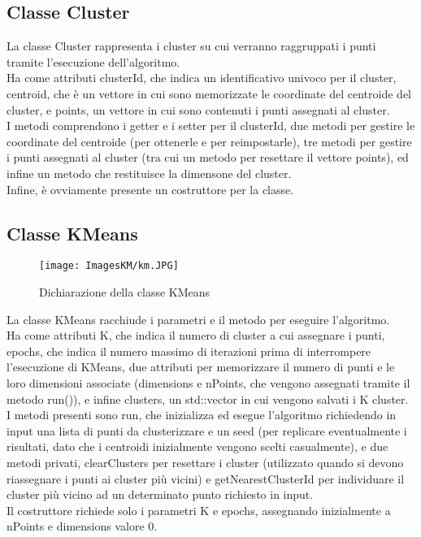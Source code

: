 \documentclass[10pt,twocolumn,letterpaper]{article}
\begin{document}
\subsection{Classe Cluster}
La classe Cluster rappresenta i cluster su cui verranno raggruppati i punti tramite l'esecuzione dell'algoritmo.\\
Ha come attributi clusterId, che  indica un identificativo univoco per il cluster, centroid, che è un vettore in cui sono memorizzate le coordinate del centroide del cluster, e points, un vettore in cui sono contenuti i punti assegnati al cluster.\\
I metodi comprendono i getter e i setter per il clusterId, due metodi per gestire le coordinate del centroide (per ottenerle e per reimpostarle), tre metodi per gestire i punti assegnati al cluster (tra cui un metodo per resettare il vettore points), ed infine un metodo che restituisce la dimensone del cluster.\\
Infine, è ovviamente presente un costruttore per la classe.

\subsection{Classe KMeans}
\begin{figure}[h]
    \centering
    \texttt{[image: ImagesKM/km.JPG]}
    \caption{Dichiarazione della classe KMeans}
    \label{fig:km}
\end{figure}
La classe KMeans racchiude i parametri e il metodo per eseguire l'algoritmo.\\
Ha come attributi K, che indica il numero di cluster a cui assegnare i punti, epochs, che indica il numero massimo di iterazioni prima di interrompere l'esecuzione di KMeans, due attributi per memorizzare il numero di punti e le loro dimensioni associate (dimensions e nPoints, che vengono assegnati tramite il metodo run()), e infine clusters, un std::vector in cui vengono salvati i K cluster.\\
I metodi presenti sono run, che inizializza ed esegue l'algoritmo richiedendo in input una lista di punti da clusterizzare e un seed (per replicare eventualmente i risultati, dato che i centroidi inizialmente vengono scelti casualmente), e due metodi privati, clearClusters per resettare i cluster (utilizzato quando si devono riassegnare i punti ai cluster più vicini) e getNearestClusterId per individuare il cluster più vicino ad un determinato punto richiesto in input.\\
Il costruttore richiede solo i parametri K e epochs, assegnando inizialmente a nPoints e dimensions valore 0.
\end{document}
